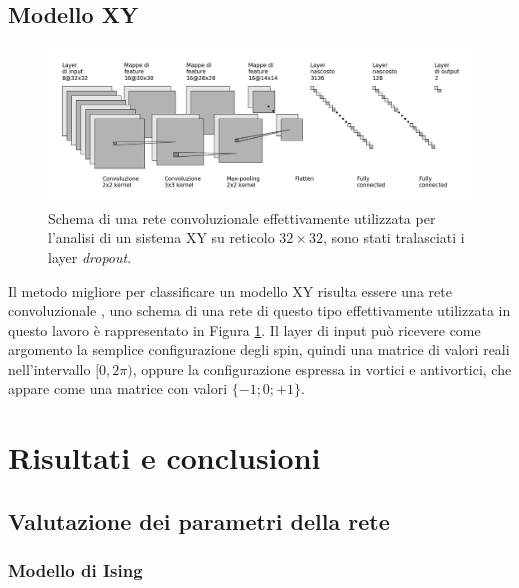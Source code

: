 \documentclass{article}
\begin{document}
\subsection{Modello XY}

\begin{figure}[ht]
 \centerline{\includegraphics[scale=0.35]{cnn.png}}
 \caption{Schema di una rete convoluzionale effettivamente utilizzata per l'analisi di un sistema XY su reticolo $32\times32$, sono stati tralasciati i layer \emph{dropout}.}
 \label{fig:cnn}
\end{figure}

Il metodo migliore per classificare un modello XY risulta essere una rete convoluzionale \cite{melko}, uno schema di una rete di questo tipo effettivamente utilizzata in questo lavoro è rappresentato in Figura \ref{fig:cnn}.
Il layer di input può ricevere come argomento la semplice configurazione degli spin, quindi una matrice di valori reali nell'intervallo $[0,2\pi)$, oppure la configurazione espressa in vortici e antivortici, che appare come una matrice con valori $\{-1;0;+1\}$.



\section{Risultati e conclusioni}

\subsection{Valutazione dei parametri della rete}

\subsubsection{Modello di Ising}
\end{document}
